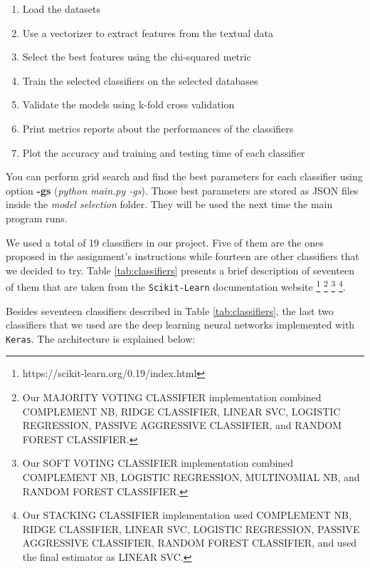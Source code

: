 \documentclass[conference]{IEEEtran}
\begin{document}
\begin{enumerate}
    \item Load the datasets
    \item Use a vectorizer to extract features from the textual data
    \item Select the best features using the chi-squared metric
    \item Train the selected classifiers on the selected databases
    \item Validate the models using k-fold cross validation
    \item Print metrics reports about the performances of the classifiers
    \item Plot the accuracy and training and testing time of each classifier
\end{enumerate}

You can perform grid search and find the best parameters for each classifier using option \textbf{-gs} (\textit{python main.py -gs}). Those best parameters are stored as JSON files inside the \textit{model selection} folder. They will be used the next time the main program runs.

We used a total of 19 classifiers in our project. Five of them are the ones proposed in the assignment's instructions while fourteen are other classifiers that we decided to try. Table \ref{tab:classifiers} presents a brief description of seventeen of them that are taken from the \texttt{Scikit-Learn} documentation website \footnote{https://scikit-learn.org/0.19/index.html} \footnote{Our MAJORITY VOTING CLASSIFIER implementation combined COMPLEMENT NB, RIDGE CLASSIFIER, LINEAR SVC, LOGISTIC REGRESSION, PASSIVE AGGRESSIVE CLASSIFIER, and RANDOM FOREST CLASSIFIER.} \footnote{Our SOFT VOTING CLASSIFIER implementation combined COMPLEMENT NB, LOGISTIC REGRESSION, MULTINOMIAL NB, and RANDOM FOREST CLASSIFIER.} \footnote{Our STACKING CLASSIFIER implementation used COMPLEMENT NB, RIDGE CLASSIFIER, LINEAR SVC, LOGISTIC REGRESSION, PASSIVE AGGRESSIVE CLASSIFIER, RANDOM FOREST CLASSIFIER, and used the final estimator as LINEAR SVC.}.

Besides seventeen classifiers described in Table \ref{tab:classifiers}, the last two classifiers that we used are the deep learning neural networks implemented with \texttt{Keras}\cite{chollet2015keras}. The architecture is explained below:
\end{document}
